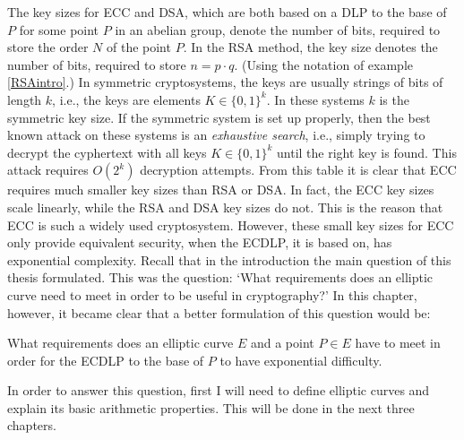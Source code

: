 \documentclass{article}
\numberwithin{equation}{section}
\theoremstyle{definition}
\begin{document}
The key sizes for ECC and DSA, which are both based on a DLP to the base of $P$ for some point $P$ in an abelian group, denote the number of bits, required to store the order $N$ of the point $P$. In the RSA method, the key size denotes the number of bits, required to store $n=p\cdot q$. (Using the notation of example \ref{RSAintro}.) In symmetric cryptosystems, the keys are usually strings of bits of length $k$, i.e., the keys are elements $K\in\{0,1\}^k$. In these systems $k$ is the symmetric key size. If the symmetric system is set up properly, then the best known attack on these systems is an \emph{exhaustive search}, i.e., simply trying to decrypt the cyphertext with all keys $K \in\{0,1\}^k$ until the right key is found. This attack requires $O(2^k)$ decryption attempts. From this table it is clear that ECC requires much smaller key sizes than RSA or DSA. In fact, the ECC key sizes scale linearly, while the RSA and DSA key sizes do not. This is the reason that ECC is such a widely used cryptosystem. However, these small key sizes for ECC only provide equivalent security, when the ECDLP, it is based on, has exponential complexity. Recall that in the introduction the main question of this thesis formulated. This was the question: `What requirements does an elliptic curve need to meet in order to be useful in cryptography?' In this chapter, however, it became clear that a better formulation of this question would be:
\begin{center}
What requirements does an elliptic curve $E$ and a point $P\in E$ have to meet in order for the ECDLP to the base of $P$ to have exponential difficulty.
\end{center}
In order to answer this question, first I will need to define elliptic curves and explain its basic arithmetic properties. This will be done in the next three chapters.\newpage 
\end{document}
